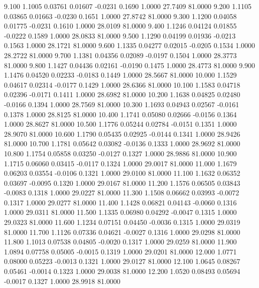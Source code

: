    9.100   1.1005   0.03761   0.01607  -0.0231   0.1690   1.0000  27.7409  81.0000
   9.200   1.1105   0.03865   0.01663  -0.0230   0.1651   1.0000  27.8742  81.0000
   9.300   1.1200   0.04058   0.01775  -0.0231   0.1610   1.0000  28.0109  81.0000
   9.400   1.1246   0.04124   0.01855  -0.0222   0.1589   1.0000  28.0833  81.0000
   9.500   1.1290   0.04199   0.01936  -0.0213   0.1563   1.0000  28.1721  81.0000
   9.600   1.1335   0.04277   0.02015  -0.0205   0.1534   1.0000  28.2722  81.0000
   9.700   1.1381   0.04356   0.02089  -0.0197   0.1504   1.0000  28.3773  81.0000
   9.800   1.1427   0.04436   0.02161  -0.0190   0.1475   1.0000  28.4773  81.0000
   9.900   1.1476   0.04520   0.02233  -0.0183   0.1449   1.0000  28.5667  81.0000
  10.000   1.1529   0.04617   0.02314  -0.0177   0.1429   1.0000  28.6366  81.0000
  10.100   1.1583   0.04718   0.02396  -0.0171   0.1411   1.0000  28.6982  81.0000
  10.200   1.1638   0.04825   0.02480  -0.0166   0.1394   1.0000  28.7569  81.0000
  10.300   1.1693   0.04943   0.02567  -0.0161   0.1378   1.0000  28.8125  81.0000
  10.400   1.1741   0.05080   0.02666  -0.0156   0.1364   1.0000  28.8627  81.0000
  10.500   1.1776   0.05244   0.02784  -0.0151   0.1351   1.0000  28.9070  81.0000
  10.600   1.1790   0.05435   0.02925  -0.0144   0.1341   1.0000  28.9426  81.0000
  10.700   1.1781   0.05642   0.03082  -0.0136   0.1333   1.0000  28.9692  81.0000
  10.800   1.1754   0.05858   0.03250  -0.0127   0.1327   1.0000  28.9886  81.0000
  10.900   1.1715   0.06060   0.03415  -0.0117   0.1324   1.0000  29.0017  81.0000
  11.000   1.1679   0.06203   0.03554  -0.0106   0.1321   1.0000  29.0100  81.0000
  11.100   1.1632   0.06352   0.03697  -0.0095   0.1320   1.0000  29.0167  81.0000
  11.200   1.1576   0.06505   0.03843  -0.0083   0.1318   1.0000  29.0227  81.0000
  11.300   1.1508   0.06662   0.03993  -0.0072   0.1317   1.0000  29.0277  81.0000
  11.400   1.1428   0.06821   0.04143  -0.0060   0.1316   1.0000  29.0311  81.0000
  11.500   1.1335   0.06980   0.04292  -0.0047   0.1315   1.0000  29.0323  81.0000
  11.600   1.1234   0.07151   0.04450  -0.0036   0.1315   1.0000  29.0319  81.0000
  11.700   1.1126   0.07336   0.04621  -0.0027   0.1316   1.0000  29.0298  81.0000
  11.800   1.1013   0.07538   0.04805  -0.0020   0.1317   1.0000  29.0259  81.0000
  11.900   1.0894   0.07758   0.05005  -0.0015   0.1319   1.0000  29.0201  81.0000
  12.000   1.0771   0.08000   0.05223  -0.0013   0.1321   1.0000  29.0127  81.0000
  12.100   1.0645   0.08267   0.05461  -0.0014   0.1323   1.0000  29.0038  81.0000
  12.200   1.0520   0.08493   0.05694  -0.0017   0.1327   1.0000  28.9918  81.0000
